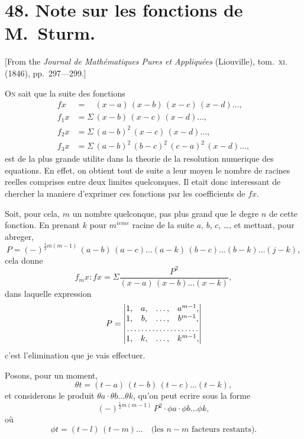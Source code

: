 \documentclass[11pt,a4paper]{book}
\begin{document}
\newpage


\section*{48. Note sur les fonctions de M.~Sturm.}

[From the \textit{Journal de Math\'ematiques Pures et Appliqu\'ees} (Liouville), tom.~\textsc{xi}. (1846), pp.~297---299.]

\bigskip

\textsc{On} sait que la suite des fonctions
\begin{align*}
fx &= \phantom{\Sigma\,}(x-a)\,(x-b)\,(x-c)\,(x-d) \ldots, \\
f_1x &= \Sigma\,(x-b)\,(x-c)\,(x-d) \ldots, \\
f_2x &= \Sigma\,(a-b)^2\,(x-c)\,(x-d) \ldots, \\
f_3x &= \Sigma\,(a-b)^2\,(b-c)^2\,(c-a)^2\,(x-d) \ldots,
\end{align*}
est de la plus grande utilite dans la theorie de la resolution numerique des equations. En effet, on obtient tout de suite a leur moyen le nombre de racines reelles comprises entre deux limites quelconques. Il etait donc interessant de chercher la maniere d'exprimer ces fonctions par les coefficients de $fx$.

Soit, pour cela, $m$ un nombre quelconque, pas plus grand que le degre $n$ de cette fonction. En prenant $k$ pour $m^{ieme}$ racine de la suite $a$, $b$, $c$, \ldots, et mettant, pour abreger,
\[
P = (-)^{\frac{1}{2}m(m-1)}\,(a-b)\,(a-c) \ldots (a-k)\,(b-c) \ldots (b-k) \ldots (j-k),
\]
cela donne
\[
f_mx : fx = \Sigma \frac{P^2}{(x-a)\,(x-b) \ldots (x-k)},
\]
dans laquelle expression
\[
P = \begin{vmatrix}
1, & a, & \ldots, & a^{m-1}, \\
1, & b, & \ldots, & b^{m-1}, \\
\multicolumn{4}{c}{\dotfill} \\
1, & k, & \ldots, & k^{m-1},
\end{vmatrix}
\]
c'est l'elimination que je vais effectuer.

Posons, pour un moment,
\[
\theta t = (t-a)\,(t-b)\,(t-c) \ldots (t-k),
\]
et considerons le produit $\theta a \cdot \theta b \ldots \theta k$, qu'on peut ecrire sous la forme
\[
(-)^{\frac{1}{2}m(m-1)}\,P^2 \cdot \phi a \cdot \phi b \ldots \phi k,
\]
où
\[
\phi t = (t-l)\,(t-m) \ldots \quad \text{(les $n-m$ facteurs restants).}
\]
\end{document}
